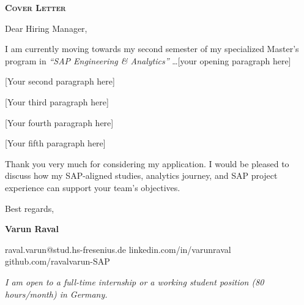 \documentclass[11pt, a4paper]{article}
\newcommand{\href}[2]{#2}
\begin{document}
\begin{center}
  {\large \textbf{\textsc{Cover Letter}}}
\end{center}

\vspace{1.2em}

Dear Hiring Manager,

\vspace{0.4em}

I am currently moving towards my second semester of my specialized Master's
program in \textit{``SAP Engineering \& Analytics''} \ldots [your opening paragraph here]

[Your second paragraph here]

[Your third paragraph here]

[Your fourth paragraph here]

[Your fifth paragraph here]

\vspace{0.4em}
Thank you very much for considering my application. I would be pleased to
discuss how my SAP\nobreakdash-aligned studies, analytics journey, and SAP project
experience can support your team's objectives.

\vspace{1.6em}
Best regards,

\vspace{0.3em}
\textbf{Varun Raval}

\vspace{0.2em}
\small
\href{mailto:raval.varun@stud.hs-fresenius.de}{raval.varun@stud.hs-fresenius.de}
\enspace\textbar\enspace
\href{https://linkedin.com/in/varunraval}{linkedin.com/in/varunraval}
\enspace\textbar\enspace
\href{https://github.com/ravalvarun-SAP}{github.com/ravalvarun-SAP}

\vspace{0.4em}
\small\textit{I am open to a full-time internship or a working student position
(80\,hours/month) in Germany.}
\end{document}
